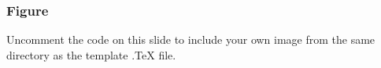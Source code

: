 \documentclass{beamer}
\begin{document}

\begin{frame}
\frametitle{Figure}
Uncomment the code on this slide to include your own image from the same directory as the template .TeX file.
\end{frame}
\end{document}
